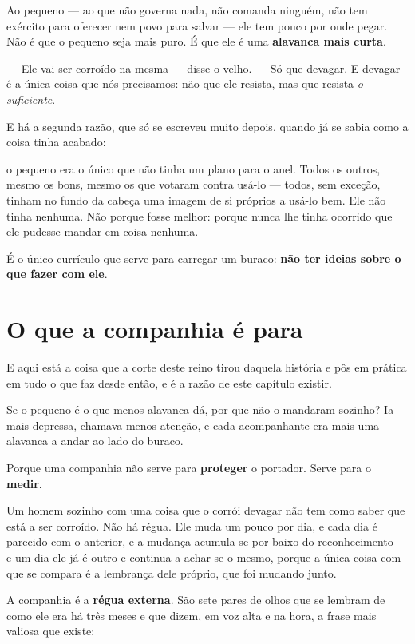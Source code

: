 \documentclass[livro.tex]{subfiles}
\begin{document}
Ao pequeno --- ao que não governa nada, não comanda ninguém, não tem exército para
oferecer nem povo para salvar --- ele tem pouco por onde pegar. Não é que o pequeno seja
mais puro. É que ele é uma \textbf{alavanca mais curta}.

--- Ele vai ser corroído na mesma --- disse o velho. --- Só que devagar. E devagar é a
única coisa que nós precisamos: não que ele resista, mas que resista \emph{o suficiente}.

\medskip

E há a segunda razão, que só se escreveu muito depois, quando já se sabia como a coisa
tinha acabado:

o pequeno era o único que não tinha um plano para o anel. Todos os outros, mesmo os bons,
mesmo os que votaram contra usá-lo --- todos, sem exceção, tinham no fundo da cabeça uma
imagem de si próprios a usá-lo bem. Ele não tinha nenhuma. Não porque fosse melhor: porque
nunca lhe tinha ocorrido que ele pudesse mandar em coisa nenhuma.

É o único currículo que serve para carregar um buraco: \textbf{não ter ideias sobre o que
fazer com ele}.

\section{O que a companhia é para}

E aqui está a coisa que a corte deste reino tirou daquela história e pôs em prática em
tudo o que faz desde então, e é a razão de este capítulo existir.

Se o pequeno é o que menos alavanca dá, por que não o mandaram sozinho? Ia mais depressa,
chamava menos atenção, e cada acompanhante era mais uma alavanca a andar ao lado do
buraco.

\medskip

Porque uma companhia não serve para \textbf{proteger} o portador. Serve para o
\textbf{medir}.

Um homem sozinho com uma coisa que o corrói devagar não tem como saber que está a ser
corroído. Não há régua. Ele muda um pouco por dia, e cada dia é parecido com o anterior, e
a mudança acumula-se por baixo do reconhecimento --- e um dia ele já é outro e continua a
achar-se o mesmo, porque a única coisa com que se compara é a lembrança dele próprio, que
foi mudando junto.

A companhia é a \textbf{régua externa}. São sete pares de olhos que se lembram de como ele
era há três meses e que dizem, em voz alta e na hora, a frase mais valiosa que existe:
\end{document}
